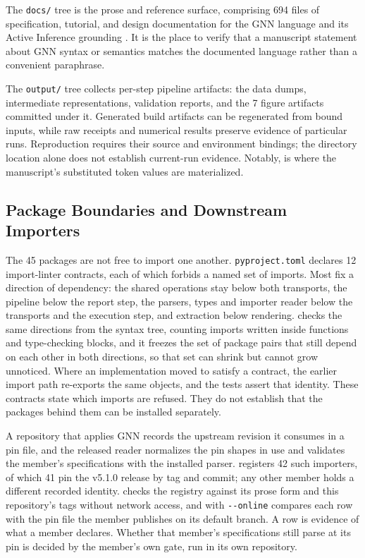 \documentclass[
  english,
  9pt,
]{extarticle}
\begin{document}
The \texttt{docs/} tree is the prose and reference surface, comprising
694 files of specification, tutorial, and design documentation for the
GNN language and its Active Inference grounding \citep{gnn2023}. It is
the place to verify that a manuscript statement about GNN syntax or
semantics matches the documented language rather than a convenient
paraphrase.

The \texttt{output/} tree collects per-step pipeline artifacts: the data
dumps, intermediate representations, validation reports, and the 7
figure artifacts committed under it. Generated build artifacts can be
regenerated from bound inputs, while raw receipts and numerical results
preserve evidence of particular runs. Reproduction requires their source
and environment bindings; the directory location alone does not
establish current-run evidence. Notably,
 is where the
manuscript's substituted token values are materialized.

\subsection{Package Boundaries and Downstream
Importers}\label{package-boundaries-and-downstream-importers}

The 45 packages are not free to import one another.
\texttt{pyproject.toml} declares 12 import-linter contracts, each of
which forbids a named set of imports. Most fix a direction of
dependency: the shared operations stay below both transports, the
pipeline below the report step, the parsers, types and importer reader
below the transports and the execution step, and extraction below
rendering. 
checks the same directions from the syntax tree, counting imports
written inside functions and type-checking blocks, and it freezes the
set of package pairs that still depend on each other in both directions,
so that set can shrink but cannot grow unnoticed. Where an
implementation moved to satisfy a contract, the earlier import path
re-exports the same objects, and the tests assert that identity. These
contracts state which imports are refused. They do not establish that
the packages behind them can be installed separately.

A repository that applies GNN records the upstream revision it consumes
in a pin file, and the released reader 
normalizes the pin shapes in use and validates the member's
specifications with the installed parser.
 registers 42 such importers, of
which 41 pin the v5.1.0 release by tag and commit; any other member
holds a different recorded identity.
 checks the registry
against its prose form and this repository's tags without network
access, and with \texttt{-\/-online} compares each row with the pin file
the member publishes on its default branch. A row is evidence of what a
member declares. Whether that member's specifications still parse at its
pin is decided by the member's own gate, run in its own repository.
\end{document}
